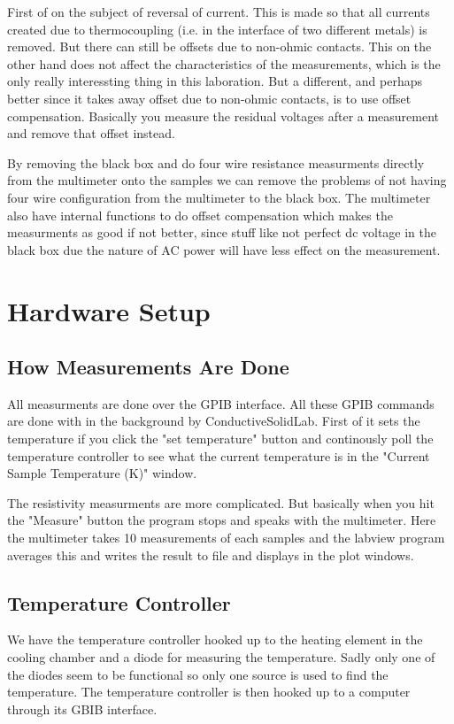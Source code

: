 \documentclass[a4paper,12pt]{article}
\begin{document}
First of on the subject of reversal of current. This is made so that all currents created due to thermocoupling (i.e. in the interface of two different metals) is removed. But there can still be offsets due to non-ohmic contacts. This on the other hand does not affect the characteristics of the measurements, which is the only really interessting thing in this laboration. But a different, and perhaps better since it takes away offset due to non-ohmic contacts, is to use offset compensation. Basically you measure the residual voltages after a measurement and remove that offset instead.

By removing the black box and do four wire resistance measurments directly from the multimeter onto the samples we can remove the problems of not having four wire configuration from the multimeter to the black box. The multimeter also have internal functions to do offset compensation which makes the measurments as good if not better, since stuff like not perfect dc voltage in the black box due the nature of AC power will have less effect on the measurement.  

\section{Hardware Setup}
\subsection{How Measurements Are Done}
All measurments are done over the GPIB interface. All these GPIB commands are done with in the background by ConductiveSolidLab. First of it sets the temperature if you click the "set temperature" button and continously poll the temperature controller to see what the current temperature is in the "Current Sample Temperature (K)" window. 

The resistivity measurments are more complicated. But basically when you hit the "Measure" button the program stops and speaks with the multimeter. Here the multimeter takes 10 measurements of each samples and the labview program averages this and writes the result to file and displays in the plot windows. 

\subsection{Temperature Controller}
We have the temperature controller hooked up to the heating element in the cooling chamber and a diode for measuring the temperature. Sadly only one of the diodes seem to be functional so only one source is used to find the temperature. The temperature controller is then hooked up to a computer through its GBIB interface.
\end{document}
